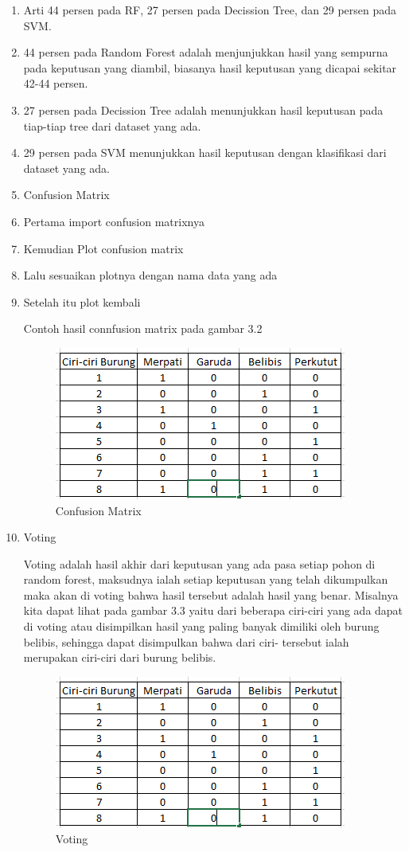 \begin{enumerate}
\item Arti 44 persen pada RF, 27 persen pada Decission Tree, dan 29 persen pada SVM.
\item 44 persen pada Random Forest adalah menjunjukkan hasil yang sempurna pada keputusan yang diambil, biasanya hasil keputusan yang dicapai sekitar 42-44 persen.
\item 27 persen pada Decission Tree adalah menunjukkan hasil keputusan pada tiap-tiap tree dari dataset yang ada.
\item 29 persen pada SVM menunjukkan hasil keputusan dengan klasifikasi dari dataset yang ada.
\item Confusion Matrix
\item Pertama import confusion matrixnya
\item Kemudian Plot confusion matrix
\item Lalu sesuaikan plotnya dengan nama data yang ada
\item Setelah itu plot kembali
\par
Contoh hasil connfusion matrix pada gambar 3.2
\begin{figure}[ht]
\centering
\includegraphics[scale=0.9]{figures/RF/1_2.png}
\caption{Confusion Matrix}
\end{figure}
\item Voting
\par
Voting adalah hasil akhir dari keputusan yang ada pasa setiap pohon di random forest, maksudnya ialah setiap keputusan yang telah dikumpulkan maka akan di voting bahwa hasil tersebut adalah hasil yang benar. Misalnya kita dapat lihat pada gambar 3.3 yaitu dari beberapa ciri-ciri yang ada dapat di voting atau disimpilkan hasil yang paling banyak dimiliki oleh burung belibis, sehingga dapat disimpulkan bahwa dari ciri- tersebut ialah merupakan ciri-ciri dari burung belibis. 
\begin{figure}[ht]
\centering
\includegraphics[scale=0.9]{figures/RF/1_2.png}
\caption{Voting}
\end{figure}

\end{enumerate}




